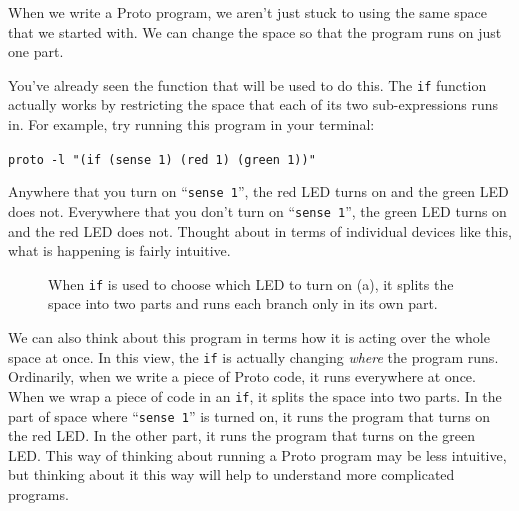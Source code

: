 \documentclass{article}
\newcommand\code[1]{\begin{center}\var{#1}\end{center}}
\newcommand\var[1]{{\tt #1}}
\newcommand\qvar[1]{``{\tt #1}''}
\begin{document}
When we write a Proto program, we aren't just stuck to using the same
space that we started with.  We can change the space so that the
program runs on just one part.

You've already seen the function that will be used to do this.  The
\var{if} function actually works by restricting the space that each of
its two sub-expressions runs in.  For example, try running this
program in your terminal:

\code{proto -l "(if (sense 1) (red 1) (green 1))"}

Anywhere that you turn on \qvar{sense 1}, the red LED turns on and the
green LED does not.  Everywhere that you don't turn on \qvar{sense 1},
the green LED turns on and the red LED does not.  Thought about in
terms of individual devices like this, what is happening is fairly
intuitive.

\begin{figure}[ht]
\centering
{}
\caption{When \var{if} is used to choose which LED to turn on (a), it
  splits the space into two parts and runs each branch only in its own
  part.}
\label{f:restriction}
\end{figure}

We can also think about this program in terms how it is acting over
the whole space at once.  In this view, the \var{if} is actually
changing {\em where} the program runs.  Ordinarily, when we write a
piece of Proto code, it runs everywhere at once.  When we wrap a piece
of code in an \var{if}, it splits the space into two parts.  In the
part of space where \qvar{sense 1} is turned on, it runs the program
that turns on the red LED.  In the other part, it runs the program
that turns on the green LED.  This way of thinking about running a
Proto program may be less intuitive, but thinking about it this way
will help to understand more complicated programs.
\end{document}
